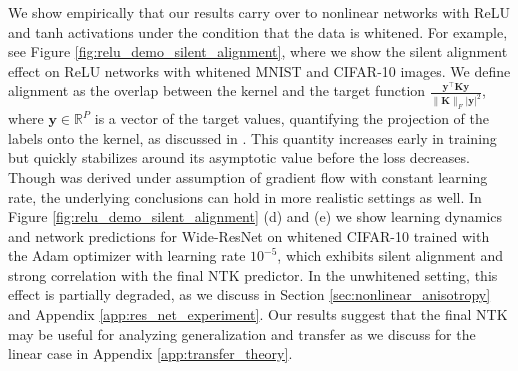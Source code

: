\documentclass{article} %
\begin{document}
We show empirically that our results carry over to nonlinear networks with ReLU and tanh activations under the condition that the data is whitened. For example, see Figure \ref{fig:relu_demo_silent_alignment}, where we show the silent alignment effect on ReLU networks with whitened MNIST and CIFAR-10 images. We define alignment as the overlap between the kernel and the target function $\frac{\bm y^\top \bm K \bm y}{\|\bm K\|_F |\bm y|^2}$, where $\bm y \in \mathbb{R}^P$ is a vector of the target values, quantifying the projection of the labels onto the kernel, as discussed in \citep{cortes2012algorithms}. This quantity increases early in training but quickly stabilizes around its asymptotic value before the loss decreases. Though  was derived under assumption of gradient flow with constant learning rate, the underlying conclusions can hold in more realistic settings as well. In Figure \ref{fig:relu_demo_silent_alignment} (d) and (e) we show learning dynamics and network predictions for Wide-ResNet \citep{zagoruyko2017wide} on whitened CIFAR-10 trained with the Adam optimizer \citep{kingma2014adam} with learning rate $10^{-5}$, which exhibits silent alignment and strong correlation with the final NTK predictor. In the unwhitened setting, this effect is partially degraded, as we discuss in Section \ref{sec:nonlinear_anisotropy} and Appendix \ref{app:res_net_experiment}. Our results suggest that the final NTK may be useful for analyzing generalization and transfer as we discuss for the linear case in Appendix \ref{app:transfer_theory}. 
\end{document}
